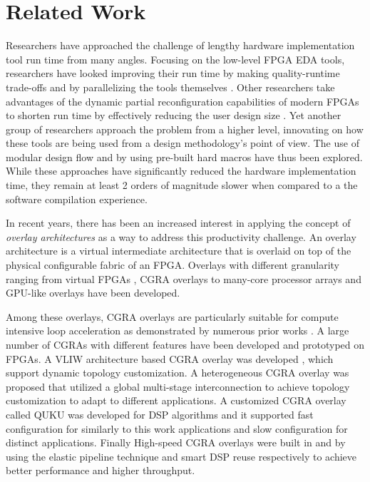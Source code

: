 \section{Related Work}\label{sec:relatedwork}
Researchers have approached the challenge of lengthy hardware implementation tool run time from many angles.  Focusing on the low-level FPGA EDA tools, researchers have looked improving their run time by making quality-runtime trade-offs \cite{mulpuri2001runtime} and by parallelizing the tools themselves \cite{moctar2014parallel, goeders2011deterministic, altera-pc, 
xilinx-pc}.
Other researchers take advantages of the dynamic partial reconfiguration capabilities of modern FPGAs to shorten run time by effectively reducing the user design size \cite{Frangieh2010}.
Yet another group of researchers approach the problem from a higher level, innovating on how these tools are being used from a design methodology's point of view.  The use of modular design flow and by using pre-built hard macros \cite{lavin2013improving, korf2011automatic} have thus been explored.
While these approaches have significantly reduced the hardware implementation time, they remain at least 2 orders of magnitude slower when compared to a the software compilation experience. 

In recent years, there has been an increased interest in applying the concept 
of \emph{overlay architectures} as a way to address this productivity challenge. 
An overlay architecture is a virtual intermediate architecture that is overlaid 
on top of the physical configurable fabric of an FPGA. Overlays with different 
granularity ranging from virtual FPGAs \cite{zuma2013carl,Grant2011Malibu,
Coole2010Intermediate,Koch2013CI}, CGRA overlays \cite{kissler2006dynamically, 
ferreira2011fpga, shukla2006quku, capalijia2013pipelined, dsp2015cgra} to many-core processor arrays \cite{Lebedev2010, hannig2014invasive, boppu2014compact} and GPU-like overlays \cite{Jeffrey2011potential} 
have been developed. 

Among these overlays, CGRA overlays are particularly suitable for compute intensive loop acceleration as demonstrated by numerous prior works 
\cite{tessier2001reconfigurable,compton2002reconfigurable}.
A large number of CGRAs with different features have been developed and 
prototyped on FPGAs. A VLIW architecture based CGRA overlay was developed  
\cite{kissler2006dynamically}, which support dynamic topology customization. 
A heterogeneous CGRA overlay was proposed \cite{ferreira2011fpga} that utilized a global multi-stage interconnection to achieve topology customization 
to adapt to different applications. A customized CGRA overlay called 
QUKU \cite{shukla2006quku} was developed for DSP algorithms and it supported fast configuration for similarly to this work applications and slow configuration for distinct applications.
Finally High-speed CGRA overlays were built in \cite{capalijia2013pipelined} and \cite{dsp2015cgra} by using the elastic pipeline technique and smart DSP reuse respectively to achieve better performance and higher throughput.


